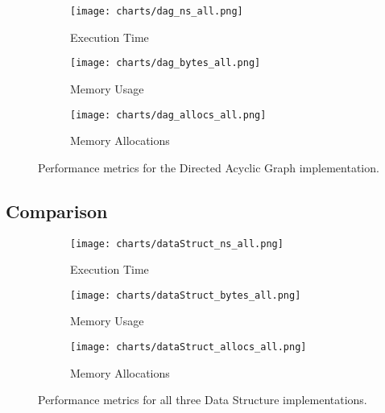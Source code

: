 \begin{figure}[H]
    \centering
    \begin{subfigure}[b]{0.8\textwidth}
        \texttt{[image: charts/dag\_ns\_all.png]}
        \caption{Execution Time}
        \label{fig:directed-acyclic-graph-execution-time}
    \end{subfigure}

    \begin{subfigure}[b]{0.8\textwidth}
        \texttt{[image: charts/dag\_bytes\_all.png]}
        \caption{Memory Usage}
        \label{fig:directed-acyclic-graph-memory-usage}
    \end{subfigure}

    \begin{subfigure}[b]{0.8\textwidth}
        \texttt{[image: charts/dag\_allocs\_all.png]}
        \caption{Memory Allocations}
        \label{fig:directed-acyclic-graph-memory-allocations}
    \end{subfigure}

    \caption{Performance metrics for the Directed Acyclic Graph implementation.}
    \label{fig:directed-acyclic-graph-performance-metrics}
\end{figure}

\subsection{Comparison}

\begin{figure}[H]
    \centering
    \begin{subfigure}[b]{0.75\textwidth}
        \texttt{[image: charts/dataStruct\_ns\_all.png]}
        \caption{Execution Time}
        \label{fig:data-structure-execution-time}
    \end{subfigure}

    \begin{subfigure}[b]{0.75\textwidth}
        \texttt{[image: charts/dataStruct\_bytes\_all.png]}
        \caption{Memory Usage}
        \label{fig:data-structure-memory-usage}
    \end{subfigure}

    \begin{subfigure}[b]{0.75\textwidth}
        \texttt{[image: charts/dataStruct\_allocs\_all.png]}
        \caption{Memory Allocations}
        \label{fig:data-structure-memory-allocations}
    \end{subfigure}

    \caption{Performance metrics for all three Data Structure implementations.}
    \label{fig:data-structure-performance-metrics}
\end{figure}
\newpage

